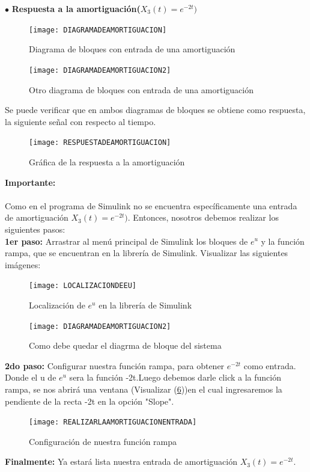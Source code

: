 \documentclass[11pt,a4paper]{article}
\begin{document}
{{\begin{enumerate}
	$\bullet$ \textbf{Respuesta a la amortiguación($X_3(t)= e^{-2t})$}\\
	
	\begin{figure}[h]
	\centering
	\texttt{[image: DIAGRAMADEAMORTIGUACION]} 
	\caption{Diagrama de bloques con entrada de una amortiguación}
\label{DIAGRAMADEAMORTIGUACION}
\end{figure}
\begin{figure}[h]
	\centering
	\texttt{[image: DIAGRAMADEAMORTIGUACION2]} 
	\caption{Otro diagrama de bloques con entrada de una amortiguación}
\label{DIAGRAMADEAMORTIGUACION2}
\end{figure}
	Se puede verificar que en ambos diagramas de bloques se obtiene como respuesta, la siguiente señal con respecto al tiempo.
	\begin{figure}[h]
	\centering
	\texttt{[image: RESPUESTADEAMORTIGUACION]} 
	\caption{Gráfica de la respuesta a la amortiguación}
\label{RESPUESTADEAMORTIGUACION}
\end{figure}
	\newpage
	\textbf{Importante:}\\\\
	Como en el programa de Simulink no se encuentra específicamente una entrada de amortiguación $X_3(t)= e^{-2t})$. Entonces, nosotros debemos realizar los siguientes pasos:\\
	\textbf{1er paso:} 
	Arrastrar al menú principal de Simulink los bloques de $e^u$ y la función rampa, que se encuentran en la librería de Simulink. Visualizar las siguientes imágenes:
	
	\begin{figure}[h]
	\centering
	\texttt{[image: LOCALIZACIONDEEU]} 
	\caption{Localización de $e^u$ en la librería de Simulink}
\label{LOCALIZACIONDEEU}
\end{figure}

	\begin{figure}[h]
	\centering
	\texttt{[image: DIAGRAMADEAMORTIGUACION2]} 
	\caption{Como debe quedar el diagrma de bloque del sistema}
\label{DIAGRAMADEAMORTIGUACION2}
\end{figure}
	\textbf{2do paso:} Configurar nuestra función rampa, para obtener $e^{-2t}$ como entrada. Donde el u de $e^u$ sera la función -2t.Luego debemos darle click a la función rampa, se nos abrirá una ventana (Visualizar (\ref{REALIZARLAAMORTIGUACIONENTRADA}))en el cual ingresaremos la pendiente de la recta -2t en la opción "Slope".
	
	\begin{figure}[h]
	\centering
	\texttt{[image: REALIZARLAAMORTIGUACIONENTRADA]} 
	\caption{Configuración de nuestra función rampa}
\label{REALIZARLAAMORTIGUACIONENTRADA}
\end{figure}
	\textbf{Finalmente:} Ya estará lista nuestra entrada de amortiguación $X_3(t)= e^{-2t}$. 
	\newpage
	

\end{enumerate}}}
\end{document}
